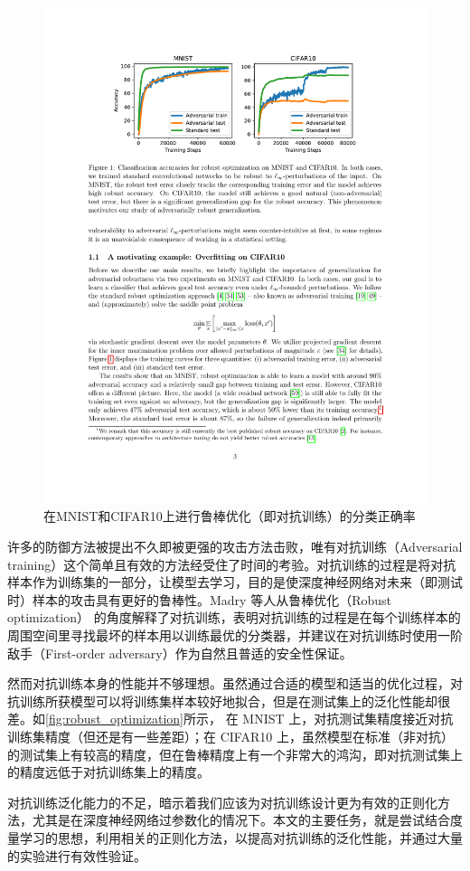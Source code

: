 \begin{figure}[h]
    \centering
    \includegraphics{fig/robust_optimization.pdf}
    \caption{在MNIST和CIFAR10上进行鲁棒优化（即对抗训练）的分类正确率}
    \label{fig:robust_optimization}
\end{figure}

许多的防御方法被提出不久即被更强的攻击方法击败，唯有对抗训练（Adversarial training）这个简单且有效的方法经受住了时间的考验。对抗训练的过程是将对抗样本作为训练集的一部分，让模型去学习，目的是使深度神经网络对未来（即测试时）样本的攻击具有更好的鲁棒性。Madry 等人\cite{madry2018towards}从鲁棒优化（Robust optimization） 的角度解释了对抗训练，表明对抗训练的过程是在每个训练样本的周围空间里寻找最坏的样本用以训练最优的分类器，并建议在对抗训练时使用一阶敌手（First-order adversary）作为自然且普适的安全性保证。

然而对抗训练本身的性能并不够理想。虽然通过合适的模型和适当的优化过程，对抗训练所获模型可以将训练集样本较好地拟合，但是在测试集上的泛化性能却很差\cite{schmidt2018adversarially}。如\autoref{fig:robust_optimization}所示， 在 MNIST 上，对抗测试集精度接近对抗训练集精度（但还是有一些差距）；在 CIFAR10 上，虽然模型在标准（非对抗）的测试集上有较高的精度，但在鲁棒精度上有一个非常大的鸿沟，即对抗测试集上的精度远低于对抗训练集上的精度。

对抗训练泛化能力的不足，暗示着我们应该为对抗训练设计更为有效的正则化方法，尤其是在深度神经网络过参数化的情况下。本文的主要任务，就是尝试结合度量学习的思想，利用相关的正则化方法，以提高对抗训练的泛化性能，并通过大量的实验进行有效性验证。